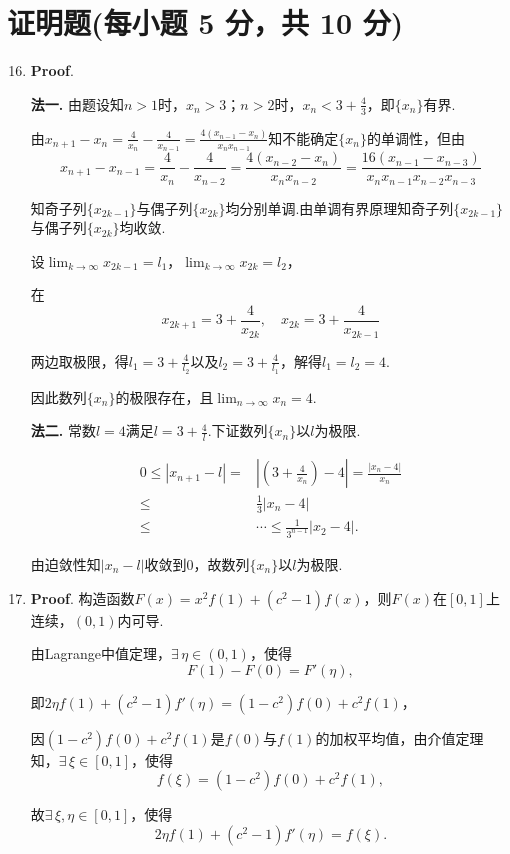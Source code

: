 \documentclass[../Main.tex]{subfiles}
\begin{document}
\section{证明题(每小题 5 分，共 10 分)}
\begin{enumerate}
    \setcounter{enumi}{15}
    \item \textbf{Proof}.

          \textbf{法一.} 由题设知$n>1$时，$x_{n}>3$；$n>2$时，$x_{n}<3+\frac{4}{3}$，即$\{
              x_{n}\}$有界.

          由$x_{n+1}-x_{n}=\frac{4}{x_{n}}-\frac{4}{x_{n-1}}=\frac{4(x_{n-1}-x_{n})}{x_{n}
                  x_{n-1}}$知不能确定$\{x_{n}\}$的单调性，但由
          \[
              x_{n+1}-x_{n-1}=\frac{4}{x_{n}}-\frac{4}{x_{n-2}}=\frac{4(x_{n-2}-x_{n})}{x_{n}
                  x_{n-2}}=\frac{16(x_{n-1}-x_{n-3})}{x_{n} x_{n-1}x_{n-2}x_{n-3}}
          \]

          知奇子列$\{x_{2k-1}\}$与偶子列$\{x_{2k}\}$均分别单调.由单调有界原理知奇子列$\{
              x_{2k-1}\}$与偶子列$\{x_{2k}\}$均收敛.

          设$\lim_{k\to\infty}x_{2k-1}=l_{1}$，$\lim_{k\to\infty}x_{2k}=l_{2}$，

          在
          \[
              x_{2k+1}=3+\frac{4}{x_{2k}},\quad x_{2k}=3+\frac{4}{x_{2k-1}}
          \]

          两边取极限，得$l_{1}=3+\frac{4}{l_{2}}$以及$l_{2}=3+\frac{4}{l_{1}}$，解得$l
                  _{1}=l_{2}=4$.

          因此数列$\{x_{n}\}$的极限存在，且$\lim_{n\to\infty}x_{n}=4$.

          \textbf{法二.} 常数$l=4$满足$l=3+\frac{4}{l}$.下证数列$\{x_{n}\}$以$l$为极限.

          \[
              \begin{aligned}
                  0\leq|x_{n+1}-l|= & \left|\left(3+\frac{4}{x_n}\right)-4\right|=\frac{|x_n-4|}{x_n} \\
                  \leq              & \frac{1}{3}|x_{n}-4|                                            \\
                  \leq              & \cdots \leq \frac{1}{3^{n-1}}|x_{2}-4|.
              \end{aligned}
          \]

          由迫敛性知$|x_{n}-l|$收敛到$0$，故数列$\{x_{n}\}$以$l$为极限.

    \item \textbf{Proof}. 构造函数$F(x)=x^{2}f(1)+(c^{2}-1)f(x)$，则$F(x)$在$[
                  0,1]$上连续，$(0,1)$内可导.

          由Lagrange中值定理，$\exists\,\eta\in(0,1)$，使得
          \[
              F(1)-F(0)=F'(\eta),
          \]

          即$2\eta f(1)+(c^{2}-1)f'(\eta)=(1-c^{2})f(0)+c^{2}f(1)$，

          因$(1-c^{2})f(0)+c^{2} f(1)$是$f(0)$与$f(1)$的加权平均值，由介值定理知，$\exists
              \,\xi\in[0,1]$，使得
          \[
              f(\xi)=(1-c^{2})f(0)+c^{2} f(1),
          \]

          故$\exists\,\xi,\eta\in[0,1]$，使得
          \[
              2\eta f(1)+(c^{2}-1)f'(\eta)=f(\xi).
          \]
\end{enumerate}
\end{document}
